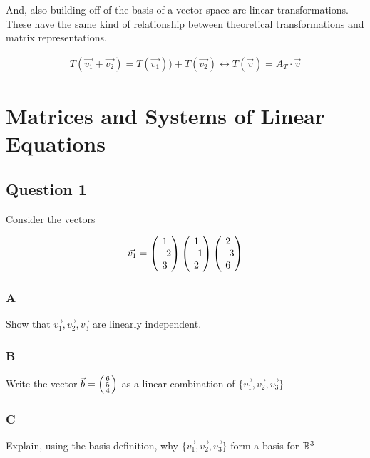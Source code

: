 \documentclass[a4paper]{article}
\begin{document}
And, also building off of the basis of a vector space are linear transformations. These have the same kind of relationship between theoretical transformations and matrix representations.

\[
	\begin{aligned}
	T(\vec{v_1} + \vec{v_2}) = T\left( \vec{v_1} \right)) + T\left( \vec{v_2} \right)
	\longleftrightarrow
	T(\vec{v}) = A_T \cdot \vec{v}
	\end{aligned}
\]

\section{Matrices and Systems of Linear Equations}
\subsection{Question 1}

Consider the vectors

\[
	\vec{v_1} = \genericmat{p}{1\\-2\\3} \genericmat{p}{1\\-1\\2} \genericmat{p}{2\\-3\\6}
\]

\subsubsection{A}

Show that $\vec{v_1}, \vec{v_2}, \vec{v_3}$ are linearly independent.

\subsubsection{B}

Write the vector $\vec{b} = \psmall{6\\5\\4}$ as a linear combination of $\{\vec{v_1}, \vec{v_2}, \vec{v_3}\}$

\subsubsection{C}

Explain, using the basis definition, why $\{\vec{v_1}, \vec{v_2}, \vec{v_3}\}$ form a basis for $\R^3$
\end{document}
